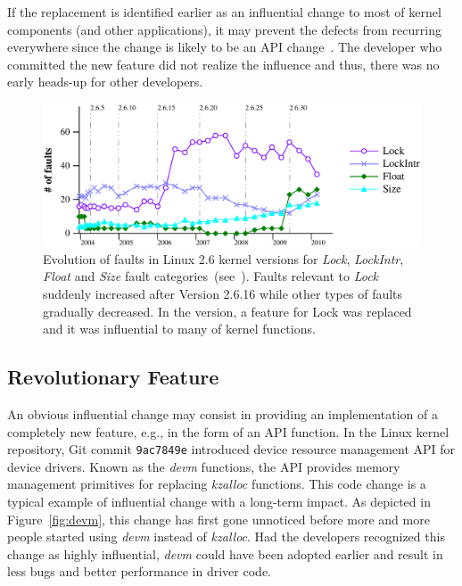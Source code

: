 If the replacement is identified earlier as an influential change to most of
kernel components (and other applications), it may prevent the defects from
recurring everywhere since the change is likely to be an API
change~\cite{linares-vasquez_api_2013,dig_how_2006}.
The developer who committed the new feature did not realize the influence and thus,
there was no early heads-up for other developers.


\begin{figure}[h!]%
\includegraphics[width=\linewidth]{fig/feature-replacement} \caption{Evolution
of faults in Linux 2.6 kernel versions for {\em Lock}, {\em LockIntr}, {\em
Float} and {\em Size} fault categories~(see~\cite{Palix10Faults}). Faults
relevant to \emph{Lock} suddenly increased after Version 2.6.16 while other
types of faults gradually decreased. In the version, a feature for Lock was
replaced and it was influential to many of kernel functions.}
\label{fig:lock_rise}
\end{figure}


\subsection{Revolutionary Feature}

An obvious influential change may consist in providing an implementation of
a completely new feature, e.g., in the form of an API function.
In the Linux kernel repository, Git commit {\tt 9ac7849e} introduced device resource management
API for device drivers. Known as the {\em devm} functions, the API
provides memory management primitives for replacing {\em kzalloc} functions.
This code change is a typical example of influential change with a long-term impact.
As depicted in Figure~\ref{fig:devm}, this change has first gone unnoticed
before more and more people started using {\em devm} instead of {\em kzalloc}.
Had the developers recognized this change as highly influential, {\em devm} could have been adopted earlier and result in less bugs and better performance in driver code.


